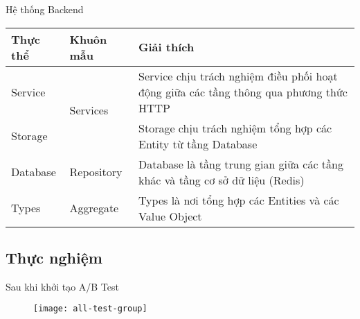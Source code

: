 \begin{frame}{Hệ thống Backend}
	\begin{table}
		\begin{tabular}{|l|l|p{7cm}|}
			\hline
			Thực thể & Khuôn mẫu                 & Giải thích                                                                             \\ \hline
			Service  & \multirow{2}{*}{Services} & Service chịu trách nghiệm điều phối hoạt động giữa các tầng thông qua phương thức HTTP \\ \cline{1-1} \cline{3-3}
			Storage  &                           & Storage chịu trách nghiệm tổng hợp các Entity từ tầng Database                         \\ \hline
			Database & Repository                & Database là tầng trung gian giữa các tầng khác và tầng cơ sở dữ liệu (Redis)           \\ \hline
			Types    & Aggregate                 & Types là nơi tổng hợp các Entities và các Value Object                                 \\ \hline
		\end{tabular}
	\end{table}
\end{frame}

\subsection{Thực nghiệm}

%
%

\begin{frame}{Sau khi khởi tạo A/B Test}
	\begin{figure}
		\centering
		\texttt{[image: all-test-group]}
	\end{figure}
\end{frame}
